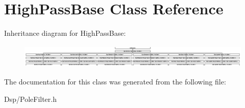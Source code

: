 \hypertarget{classHighPassBase}{\section{High\-Pass\-Base Class Reference}
\label{classHighPassBase}
}
Inheritance diagram for High\-Pass\-Base\-:\begin{figure}[H]
\begin{center}
\leavevmode
\includegraphics[height=1.140530cm]{classHighPassBase}
\end{center}
\end{figure}


The documentation for this class was generated from the following file\-:\begin{DoxyCompactItemize}
\item 
Dsp/Pole\-Filter.\-h\end{DoxyCompactItemize}
